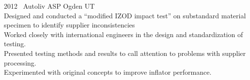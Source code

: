 \begin{entrylist}
\entry
{2012}
{\autoliv~Autoliv ASP}
{Ogden UT}
{ \\
Designed and conducted a “modified IZOD impact test” on substandard material specimen to identify supplier inconsistencies \\
Worked closely with international engineers in the design and standardization of testing. \\
Presented testing methods and results to call attention to problems with supplier processing. \\
Experimented with original concepts to improve inflator performance.\\
}
{\vspace{-0.3cm}}


\end{entrylist}